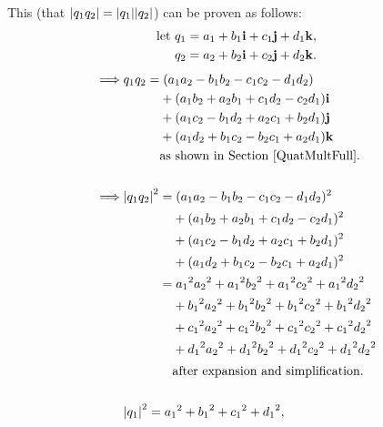 \documentclass[10pt]{article}
\begin{document}
This (that $\abs{q_1q_2} = \abs{q_1}\abs{q_2}$) can be proven as follows:
\begingroup
\allowdisplaybreaks
\begin{equation}
    \begin{aligned}
        \text{let } & q_1 = a_1 + b_1\vb{i} + c_1\vb{j} + d_1\vb{k}, \\
        & q_2 = a_2 + b_2\vb{i} + c_2\vb{j} + d_2\vb{k}. \\
    \end{aligned}
\end{equation}
\begin{alignat}{2}
    \implies & q_1q_2 = (a_1a_2 - b_1b_2 - c_1c_2 - d_1d_2) \\
             & \phantom{q_1q_2=} + (a_1b_2 + a_2b_1 + c_1d_2 - c_2d_1)\vb{i} \nonumber \\
             & \phantom{q_1q_2=} + (a_1c_2 - b_1d_2 + a_2c_1 + b_2d_1)\vb{j} \nonumber \\
             & \phantom{q_1q_2=} + (a_1d_2 + b_1c_2 - b_2c_1 + a_2d_1)\vb{k} \nonumber \\
             & \phantom{q_1q_2=} \text{as shown in Section \ref{QuatMultFull}}. \nonumber \\[15pt]
    \implies & \abs{q_1q_2}^2 = (a_1a_2 - b_1b_2 - c_1c_2 - d_1d_2)^2 \\
             & \phantom{\abs{q_1q_2}^2=} + (a_1b_2 + a_2b_1 + c_1d_2 - c_2d_1)^2 \nonumber \\
             & \phantom{\abs{q_1q_2}^2=} + (a_1c_2 - b_1d_2 + a_2c_1 + b_2d_1)^2 \nonumber \\
             & \phantom{\abs{q_1q_2}^2=} + (a_1d_2 + b_1c_2 - b_2c_1 + a_2d_1)^2 \nonumber \\
             & \phantom{\abs{q_1q_2}^2} = {a_1}^2{a_2}^2 + {a_1}^2{b_2}^2 + {a_1}^2{c_2}^2 + {a_1}^2{d_2}^2 \label{eqnq1q2-1} \\
             & \phantom{\abs{q_1q_2}^2=} + {b_1}^2{a_2}^2 + {b_1}^2{b_2}^2 + {b_1}^2{c_2}^2 + {b_1}^2{d_2}^2 \nonumber \\
             & \phantom{\abs{q_1q_2}^2=} + {c_1}^2{a_2}^2 + {c_1}^2{b_2}^2 + {c_1}^2{c_2}^2 + {c_1}^2{d_2}^2 \nonumber \\
             & \phantom{\abs{q_1q_2}^2=} + {d_1}^2{a_2}^2 + {d_1}^2{b_2}^2 + {d_1}^2{c_2}^2 + {d_1}^2{d_2}^2 \nonumber \\
             & \phantom{\abs{q_1q_2}^2=} \text{after expansion and simplification.} \\[15pt]
    & \abs{q_1}^2 = {a_1}^2 + {b_1}^2 + {c_1}^2 + {d_1}^2, \\

\end{alignat}
\end{document}
